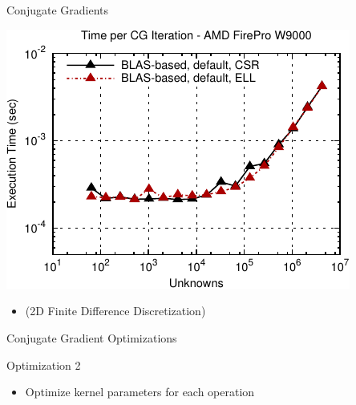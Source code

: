 \begin{frame}[fragile]{Conjugate Gradients}
 \begin{block}{}
 \begin{center}
  \vspace*{-0.5cm}
  \includegraphics[width=0.85\textwidth]{figures/cg-firepro-w9000-1}
 \end{center}

 \begin{itemize}
  \item   \vspace*{-0.3cm} {\small (2D Finite Difference Discretization)}
 \end{itemize}
 \end{block}   
\end{frame}


\begin{frame}[fragile]{Conjugate Gradient Optimizations}

 \begin{block}{Optimization 2}
   \begin{itemize}
   \item Optimize kernel parameters for each operation
  \end{itemize}
 \end{block}
   
\end{frame}

